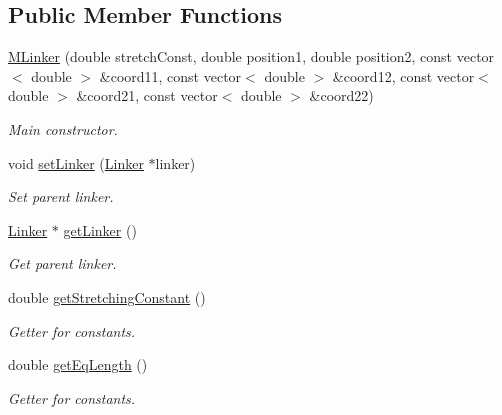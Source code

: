 \subsection*{Public Member Functions}
\begin{DoxyCompactItemize}
\item 
\hyperlink{classMLinker_a50f4462e4081c1cdf36f0c0ced8d4151}{M\+Linker} (double stretch\+Const, double position1, double position2, const vector$<$ double $>$ \&coord11, const vector$<$ double $>$ \&coord12, const vector$<$ double $>$ \&coord21, const vector$<$ double $>$ \&coord22)
\begin{DoxyCompactList}\small\item\em Main constructor. \end{DoxyCompactList}\item 
void \hyperlink{classMLinker_a48568e299d0e6d0149fe53c9ee34b99a}{set\+Linker} (\hyperlink{classLinker}{Linker} $\ast$linker)
\begin{DoxyCompactList}\small\item\em Set parent linker. \end{DoxyCompactList}\item 
\hyperlink{classLinker}{Linker} $\ast$ \hyperlink{classMLinker_a4ae89966828d6f13751b3d0429995e71}{get\+Linker} ()
\begin{DoxyCompactList}\small\item\em Get parent linker. \end{DoxyCompactList}\end{DoxyCompactItemize}
{\bf }\par
\begin{DoxyCompactItemize}
\item 
double \hyperlink{classMLinker_a6fe829d45b8889d95f8ad7ffdb143d61}{get\+Stretching\+Constant} ()
\begin{DoxyCompactList}\small\item\em Getter for constants. \end{DoxyCompactList}\item 
double \hyperlink{classMLinker_ad9e3e86cf88e4e06d1c16f6851c2f97c}{get\+Eq\+Length} ()
\begin{DoxyCompactList}\small\item\em Getter for constants. \end{DoxyCompactList}\end{DoxyCompactItemize}

